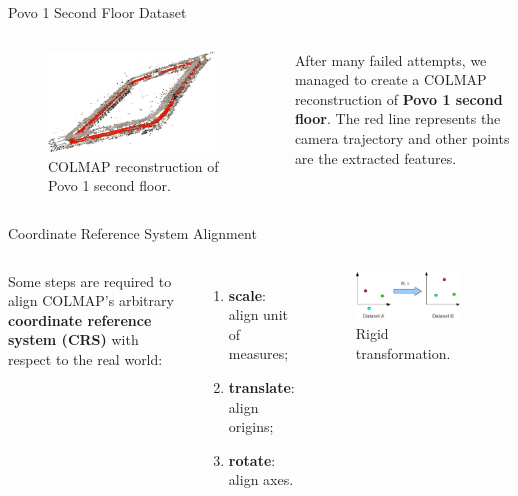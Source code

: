 \documentclass[
    center,
]{beamer}
\begin{document}
\begin{frame}{Povo 1 Second Floor Dataset}
    \begin{columns}
        \begin{figure}
            \centering
            \includegraphics[width=0.9\textwidth]{../imgs/extracted_features_colmap.png}
            \caption{COLMAP reconstruction of Povo 1 second floor.}
        \end{figure}

        After many failed attempts, we managed to create a COLMAP reconstruction of \textbf{Povo 1 second floor}. The red line represents the camera trajectory and other points are the extracted features.
    \end{columns}
\end{frame}

\begin{frame}{Coordinate Reference System Alignment}
    \begin{columns}
        Some steps are required to align COLMAP's arbitrary \textbf{coordinate reference system (CRS)} with respect to the real world:
        \begin{enumerate}
            \item \textbf{scale}: align unit of measures;
            \item \textbf{translate}: align origins;
            \item \textbf{rotate}: align axes.
        \end{enumerate}

        \begin{figure}
            \centering
            \includegraphics[width=0.9\textwidth]{../imgs/rigid_trasform.png}
            \caption{Rigid transformation.}
        \end{figure}
    \end{columns}
\end{frame}
\end{document}
